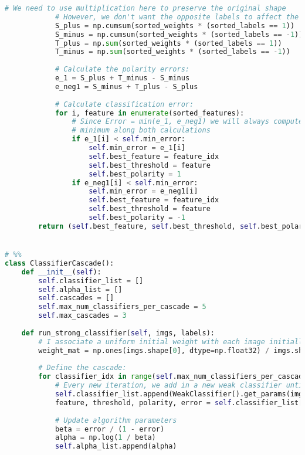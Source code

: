 \documentclass{article}
\begin{document}
\begin{lstlisting}[language=Python]
            # We need to use multiplication here to preserve the original shape
            # However, we don't want the opposite labels to affect the cumulative summ
            S_plus = np.cumsum(sorted_weights * (sorted_labels == 1))
            S_minus = np.cumsum(sorted_weights * (sorted_labels == -1))
            T_plus = np.sum(sorted_weights * (sorted_labels == 1))
            T_minus = np.sum(sorted_weights * (sorted_labels == -1))
            
            # Calculate the polarity errors:
            e_1 = S_plus + T_minus - S_minus
            e_neg1 = S_minus + T_plus - S_plus
            
            # Calculate classification error:
            for i, feature in enumerate(sorted_features):
                # Since Error = min(e_1, e_neg1) we will always compute both and keep the trailing
                # minimum along both calculations
                if e_1[i] < self.min_error:
                    self.min_error = e_1[i]
                    self.best_feature = feature_idx
                    self.best_threshold = feature
                    self.best_polarity = 1
                if e_neg1[i] < self.min_error:
                    self.min_error = e_neg1[i]
                    self.best_feature = feature_idx
                    self.best_threshold = feature
                    self.best_polarity = -1
        return (self.best_feature, self.best_threshold, self.best_polarity, self.min_error)


# %%
class ClassifierCascade():
    def __init__(self):
        self.classifier_list = []
        self.alpha_list = []
        self.cascades = []
        self.max_num_classifiers_per_cascade = 5
        self.max_cascades = 3
        
    def run_strong_classifier(self, imgs, labels):
        # I associate a uniform initial weight with each image initially:
        weight_mat = np.ones(imgs.shape[0], dtype=np.float32) / imgs.shape[0]
        
        # Define the cascade:
        for classifier_idx in range(self.max_num_classifiers_per_cascade):
            # Every new iteration, we add in a new weak classifier until we have reached the maximum number, or they have the correct accuracy.
            self.classifier_list.append(WeakClassifier().get_params(imgs, labels, weight_mat))
            feature, threshold, polarity, error = self.classifier_list[classifier_idx]
            
            # Update algorithm parameters
            beta = error / (1 - error)
            alpha = np.log(1 / beta)
            self.alpha_list.append(alpha)
            

\end{lstlisting}
\end{document}
